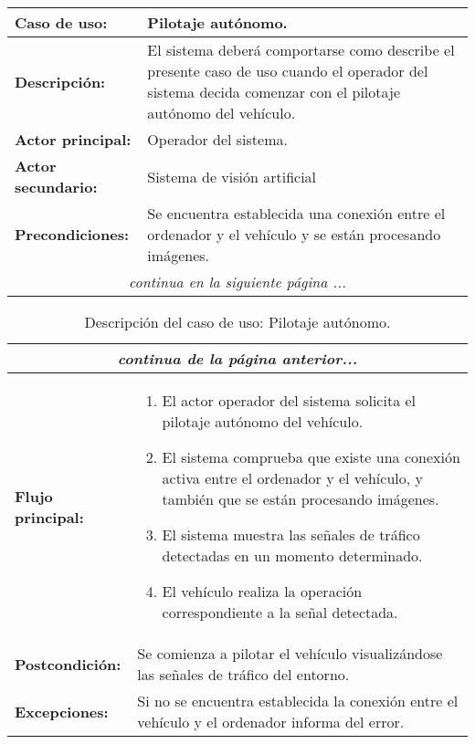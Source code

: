 \begin{table}[H]
  \begin{center}
    \begin{tabular}{|p{3.5cm}|p{10cm}|}
      \hline
      {\textbf{Caso de uso:}} & { Pilotaje autónomo.} \\
      \hline
      {\textbf{Descripción:}} & {El sistema deberá comportarse como describe el presente caso de uso cuando el operador del sistema decida comenzar con el pilotaje autónomo del vehículo.} \\
     \hline
      {\textbf{Actor principal:}} & { Operador del sistema.} \\
      \hline
      {\textbf{Actor secundario:}} & {Sistema de visión artificial}\\
      \hline
      {\textbf{Precondiciones:}} & { Se encuentra establecida una conexión entre el ordenador y el vehículo y se están procesando imágenes.} \\
     \hline 
    \multicolumn{2}{c}{\emph{continua en la siguiente página ...}}\\
    \end{tabular}
  \end{center}
\end{table}

\begin{table}[H]
  \begin{center}
    \begin{tabular}{|p{3.5cm}|p{10cm}|}
     \multicolumn{2}{c}{\emph{continua de la página anterior...}}\\
      \hline
     {\textbf{Flujo principal:}} & { 
       \begin{enumerate}
       \item El actor operador del sistema solicita el pilotaje autónomo del vehículo.
       \item El sistema comprueba que existe una conexión activa entre el ordenador y el vehículo, y también que se están
         procesando imágenes.
       \item El sistema muestra las señales de tráfico detectadas en un momento determinado.
       \item El vehículo realiza la operación correspondiente a la señal detectada.
       \end{enumerate}
     } \\
     \hline
     {\textbf{Postcondición:}} & {Se comienza a pilotar el vehículo visualizándose las señales de tráfico del entorno.}\\
     \hline
     {\textbf{Excepciones:}} & {Si no se encuentra establecida la conexión entre el vehículo y el ordenador informa del error.}\\        
     \hline
    \end{tabular}
  \end{center}
\caption{Descripción del caso de uso: Pilotaje autónomo.}
\end{table}


